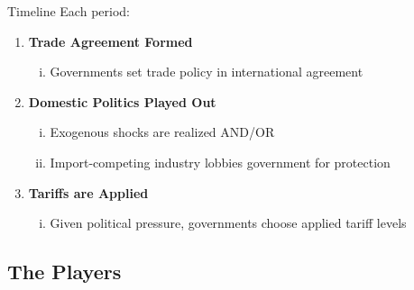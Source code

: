 \documentclass[handout]{beamer}
\begin{document}



\begin{frame}{Timeline}
\pause
Each period:
\pause
\begin{enumerate}[<+->]
	\item {\bfseries Trade Agreement Formed}
		\begin{enumerate}[i.]
			\item Governments set trade policy in international agreement
		\end{enumerate}
	\item \textbf{Domestic Politics Played Out}
		\begin{enumerate}[i.]
			\item Exogenous shocks are realized AND/OR
			\item Import-competing industry lobbies government for protection 
		\end{enumerate}
	\item \textbf{Tariffs are Applied}
		\begin{enumerate}[i.]
			\item Given political pressure, governments choose applied tariff levels
		\end{enumerate}
\end{enumerate}
\end{frame}


\subsection{The Players}
\end{document}
